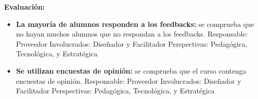 \textbf{Evaluación:}

\begin{itemize}
	\item
	\textbf{La mayoría de alumnos responden a los feedbacks:} se comprueba
	que no hayan muchos alumnos que no respondan a los feedbacks.
	{Responsable:} Proveedor {Involucrados:} Diseñador y
	Facilitador {Perspectivas:} Pedagógica, Tecnológica, y
	Estratégica
	\item
	\textbf{Se utilizan encuestas de opinión:} se comprueba que el curso
	contenga encuestas de opinión. {Responsable:} Proveedor
	{Involucrados:} Diseñador y Facilitador {Perspectivas:}
	Pedagógica, Tecnológica, y Estratégica
\end{itemize}

